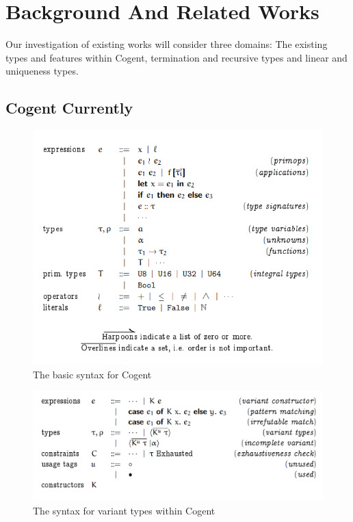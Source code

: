 \chapter{Background And Related Works}\label{ch:background}
Our investigation of existing works will consider three domains: The existing types and features
within Cogent, termination and recursive types and linear and uniqueness types.

\section{Cogent Currently}


\begin{figure}
    \centering
    \includegraphics[width=350pt]{content/CogentGrammar.png}
    \caption{The basic syntax for Cogent~\citep{ICFPCogent}}
    \label{fig:cogentGrammar}
\end{figure}

\begin{figure}
    \centering
    \includegraphics[width=400pt]{content/VariantGrammar.png}
    \caption{The syntax for variant types within Cogent~\citep{ICFPCogent}}
    \label{fig:variantGrammar}
\end{figure}

